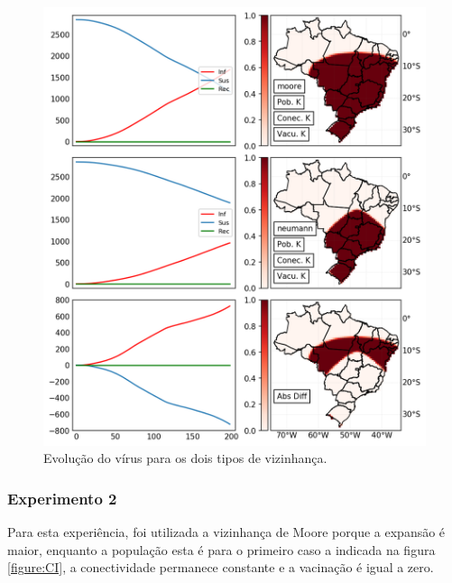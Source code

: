 \documentclass[a4paper,12pt]{article}
\begin{document}
\begin{figure}[!ht]
 \begin{center}
  \includegraphics[width=1\linewidth]{fig/Vecino.png}
 \end{center}
 \caption{Evolução do vírus para os dois tipos de vizinhança.}
\label{figure:vizinho}
\end{figure}

\newpage
\subsubsection{Experimento 2}
Para esta experiência, foi utilizada a vizinhança de Moore porque a expansão é maior, enquanto a população esta é para o primeiro caso a indicada na figura \ref{figure:CI}, a conectividade permanece constante e a vacinação é igual a zero.
\end{document}
